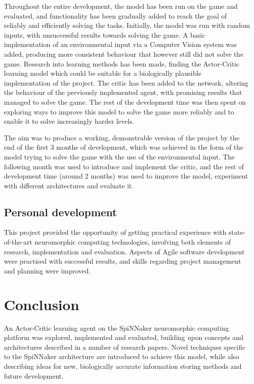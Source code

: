 \documentclass[10pt]{article}
\begin{document}
    Throughout the entire development, the model has been run on the game and evaluated, and functionality has been gradually added to reach the goal of reliably and efficiently solving the tasks. Initially, the model was run with random inputs, with unsuccessful results towards solving the game. A basic implementation of an environmental input via a Computer Vision system was added, producing more consistent behaviour that however still did not solve the game. Research into learning methods has been made, finding the Actor-Critic learning model which could be suitable for a biologically plausible implementation of the project. The critic has been added to the network, altering the behaviour of the previously implemented agent, with promising results that managed to solve the game. The rest of the development time was then spent on exploring ways to improve this model to solve the game more reliably and to enable it to solve increasingly harder levels.

    The aim was to produce a working, demonstrable version of the project by the end of the first 3 months of development, which was achieved in the form of the model trying to solve the game with the use of the environmental input. The following month was used to introduce and implement the critic, and the rest of development time (around 2 months) was used to improve the model, experiment with different architectures and evaluate it.

    \subsection{Personal development}

    This project provided the opportunity of getting practical experience with state-of-the-art neuromorphic computing technologies, involving both elements of research, implementation and evaluation. Aspects of Agile software development were practised with successful results, and skills regarding project management and planning were improved.
    
    \section{Conclusion}

    An Actor-Critic learning agent on the SpiNNaker neuromorphic computing platform was explored, implemented and evaluated, building upon concepts and architectures described in a number of research papers. Novel techniques specific to the SpiNNaker architecture are introduced to achieve this model, while also describing ideas for new, biologically accurate information storing methods and future development.
\end{document}
